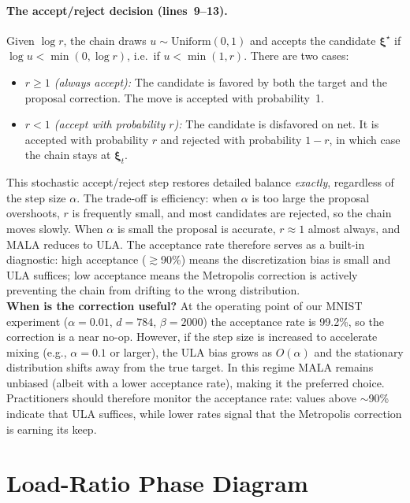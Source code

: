 \paragraph{The accept/reject decision (lines~9--13).}
Given $\log r$, the chain draws $u\sim\mathrm{Uniform}(0,1)$ and accepts the candidate $\boldsymbol{\xi}^{\star}$ if $\log u < \min(0,\log r)$, i.e.\ if $u < \min(1,r)$. There are two cases:
\begin{itemize}
\item \emph{$r\ge 1$ (always accept):} The candidate is favored by both the target and the proposal correction. The move is accepted with probability~1.
\item \emph{$r<1$ (accept with probability $r$):} The candidate is disfavored on net. It is accepted with probability $r$ and rejected with probability $1{-}r$, in which case the chain stays at $\boldsymbol{\xi}_t$.
\end{itemize}
This stochastic accept/reject step restores detailed balance \emph{exactly}, regardless of the step size $\alpha$. The trade-off is efficiency: when $\alpha$ is too large the proposal overshoots, $r$ is frequently small, and most candidates are rejected, so the chain moves slowly. When $\alpha$ is small the proposal is accurate, $r\approx 1$ almost always, and MALA reduces to ULA. The acceptance rate therefore serves as a built-in diagnostic: high acceptance ($\gtrsim$90\%) means the discretization bias is small and ULA suffices; low acceptance means the Metropolis correction is actively preventing the chain from drifting to the wrong distribution.\\

\noindent\textbf{When is the correction useful?}  At the operating point of our MNIST experiment ($\alpha{=}0.01$, $d{=}784$, $\beta{=}2000$) the acceptance rate is 99.2\%, so the correction is a near no-op. However, if the step size is increased to accelerate mixing (e.g., $\alpha{=}0.1$ or larger), the ULA bias grows as $O(\alpha)$ and the stationary distribution shifts away from the true target. In this regime MALA remains unbiased (albeit with a lower acceptance rate), making it the preferred choice. Practitioners should therefore monitor the acceptance rate: values above $\sim$90\% indicate that ULA suffices, while lower rates signal that the Metropolis correction is earning its keep.

\section{Load-Ratio Phase Diagram}\label{app:phase-diagram}

